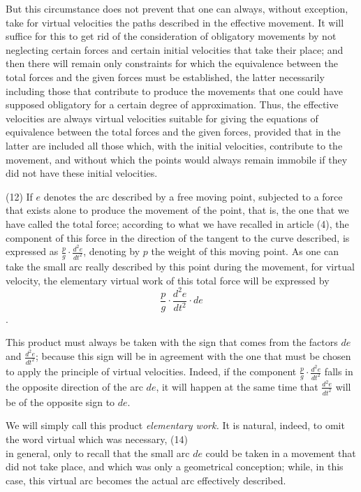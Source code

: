 \documentclass{book}
\begin{document}
But this circumstance does not prevent that one can always, without exception, take for virtual velocities the paths described in the effective movement. It will suffice for this to get rid of the consideration of obligatory movements by not neglecting certain forces and certain initial velocities that take their place; and then there will remain only constraints for which the equivalence between the total forces and the given forces must be established, the latter necessarily including those that contribute to produce the movements that one could have supposed obligatory for a certain degree of approximation. Thus, the effective velocities are always virtual velocities suitable for giving the equations of equivalence between the total forces and the given forces, provided that in the latter are included all those which, with the initial velocities, contribute to the movement, and without which the points would always remain immobile if they did not have these initial velocities.

(12) If \(e\) denotes the arc described by a free moving point, subjected to a force that exists alone to produce the movement of the point, that is, the one that we have called the total force; according to what we have recalled in article (4), the component of this force in the direction of the tangent to the curve described, is expressed as \(\frac{p}{g} \cdot \frac{d^2e}{dt^2}\), denoting by \(p\) the weight of this moving point. As one can take the small arc really described by this point during the movement, for virtual velocity, the elementary virtual work of this total force will be expressed by \[\frac{p}{g} \cdot \frac{d^2e}{dt^2} \cdot de\].

This product must always be taken with the sign that comes from the factors \(de\) and \(\frac{d^2e}{dt^2}\); because this sign will be in agreement with the one that must be chosen to apply the principle of virtual velocities. Indeed, if the component \(\frac{p}{g} \cdot \frac{d^2e}{dt^2}\) falls in the opposite direction of the arc \(de\), it will happen at the same time that \(\frac{d^2e}{dt^2}\) will be of the opposite sign to \(de\).

We will simply call this product \textit{elementary work.} It is natural, indeed, to omit the word virtual which was necessary, 
\newpage
(14)\\
in general, only to recall that the small arc \(de\) could be taken in a movement that did not take place, and which was only a geometrical conception; while, in this case, this virtual arc becomes the actual arc effectively described.
\end{document}
